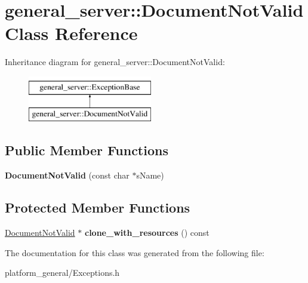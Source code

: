 \hypertarget{classgeneral__server_1_1DocumentNotValid}{\section{general\-\_\-server\-:\-:\-Document\-Not\-Valid \-Class \-Reference}
\label{classgeneral__server_1_1DocumentNotValid}
}
\-Inheritance diagram for general\-\_\-server\-:\-:\-Document\-Not\-Valid\-:\begin{figure}[H]
\begin{center}
\leavevmode
\includegraphics[height=2.000000cm]{classgeneral__server_1_1DocumentNotValid}
\end{center}
\end{figure}
\subsection*{\-Public \-Member \-Functions}
\begin{DoxyCompactItemize}
\item 
\hypertarget{classgeneral__server_1_1DocumentNotValid_a021d55bd0577043dbe0e037605239d49}{{\bfseries \-Document\-Not\-Valid} (const char $\ast$s\-Name)}\label{classgeneral__server_1_1DocumentNotValid_a021d55bd0577043dbe0e037605239d49}

\end{DoxyCompactItemize}
\subsection*{\-Protected \-Member \-Functions}
\begin{DoxyCompactItemize}
\item 
\hypertarget{classgeneral__server_1_1DocumentNotValid_aad9e39eb3ccc151e8dcdac93467e0033}{\hyperlink{classgeneral__server_1_1DocumentNotValid}{\-Document\-Not\-Valid} $\ast$ {\bfseries clone\-\_\-with\-\_\-resources} () const }\label{classgeneral__server_1_1DocumentNotValid_aad9e39eb3ccc151e8dcdac93467e0033}

\end{DoxyCompactItemize}


\-The documentation for this class was generated from the following file\-:\begin{DoxyCompactItemize}
\item 
platform\-\_\-general/\-Exceptions.\-h\end{DoxyCompactItemize}
